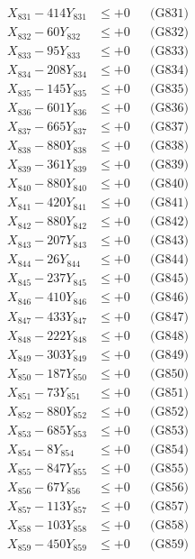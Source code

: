 \documentclass[a4paper,10pt]{article}
\begin{document}
{\begin{align}
\allowbreak
X_{831} - 414Y_{831} &\leq +0 && \text{(G831)} \\
X_{832} - 60Y_{832} &\leq +0 && \text{(G832)} \\
X_{833} - 95Y_{833} &\leq +0 && \text{(G833)} \\
X_{834} - 208Y_{834} &\leq +0 && \text{(G834)} \\
X_{835} - 145Y_{835} &\leq +0 && \text{(G835)} \\
X_{836} - 601Y_{836} &\leq +0 && \text{(G836)} \\
X_{837} - 665Y_{837} &\leq +0 && \text{(G837)} \\
X_{838} - 880Y_{838} &\leq +0 && \text{(G838)} \\
X_{839} - 361Y_{839} &\leq +0 && \text{(G839)} \\
X_{840} - 880Y_{840} &\leq +0 && \text{(G840)} \\
\allowbreak
X_{841} - 420Y_{841} &\leq +0 && \text{(G841)} \\
X_{842} - 880Y_{842} &\leq +0 && \text{(G842)} \\
X_{843} - 207Y_{843} &\leq +0 && \text{(G843)} \\
X_{844} - 26Y_{844} &\leq +0 && \text{(G844)} \\
X_{845} - 237Y_{845} &\leq +0 && \text{(G845)} \\
X_{846} - 410Y_{846} &\leq +0 && \text{(G846)} \\
X_{847} - 433Y_{847} &\leq +0 && \text{(G847)} \\
X_{848} - 222Y_{848} &\leq +0 && \text{(G848)} \\
X_{849} - 303Y_{849} &\leq +0 && \text{(G849)} \\
X_{850} - 187Y_{850} &\leq +0 && \text{(G850)} \\
\allowbreak
X_{851} - 73Y_{851} &\leq +0 && \text{(G851)} \\
X_{852} - 880Y_{852} &\leq +0 && \text{(G852)} \\
X_{853} - 685Y_{853} &\leq +0 && \text{(G853)} \\
X_{854} - 8Y_{854} &\leq +0 && \text{(G854)} \\
X_{855} - 847Y_{855} &\leq +0 && \text{(G855)} \\
X_{856} - 67Y_{856} &\leq +0 && \text{(G856)} \\
X_{857} - 113Y_{857} &\leq +0 && \text{(G857)} \\
X_{858} - 103Y_{858} &\leq +0 && \text{(G858)} \\
X_{859} - 450Y_{859} &\leq +0 && \text{(G859)} \\

\end{align}}
\end{document}
